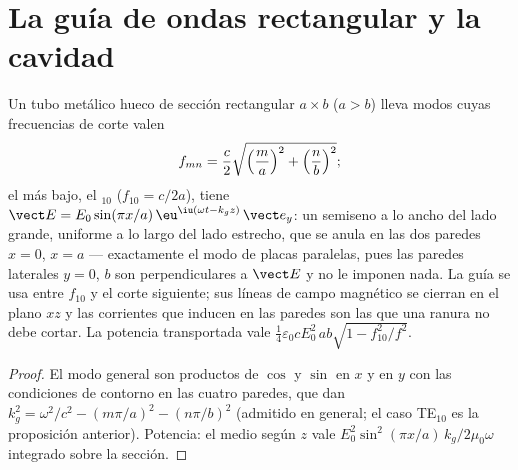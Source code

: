 \section{La guía de ondas rectangular y la cavidad}

\begin{proposition}\label{prop:b2:guided-waves:rectangular}
Un tubo metálico hueco de sección rectangular $a \times b$ ($a > b$) lleva
modos cuyas frecuencias de corte valen
\[
f_{mn} = \frac c2\sqrt{\Bigl(\frac ma\Bigr)^2 + \Bigl(\frac nb\Bigr)^2} ;
\]
el más bajo, el \emph{$_{10}$} ($f_{10} = c/2a$), tiene $\vect E = E_0\sin
(\pi x/a)\,\eu^{\iu(\omega t - k_gz)}\,\vect e_y$: un semiseno a lo ancho del lado
grande, uniforme a lo largo del lado estrecho, que se anula en las dos paredes $x = 0$,
$x = a$ --- exactamente el modo de placas paralelas, pues las paredes laterales $y = 0$, $b$
son perpendiculares a $\vect E$ y no le imponen nada. La guía se
usa entre $f_{10}$ y el corte siguiente; sus líneas de campo magnético
se cierran en el plano $xz$ y las corrientes que inducen en las paredes son
las que una ranura no debe cortar. La potencia transportada vale $\tfrac14\varepsilon_0cE_0^2\,ab
\sqrt{1 - f_{10}^2/f^2}$.
\end{proposition}

\begin{proof}
El modo general son productos de $\cos$ y $\sin$ en $x$ y en $y$ con las
condiciones de contorno en las cuatro paredes, que dan $k_g^2 = \omega^2/c^2 - (m\pi/a)^2
- (n\pi/b)^2$ (admitido en general; el caso TE$_{10}$ es la proposición
anterior). Potencia: el  medio según $z$ vale $E_0^2\sin^2(\pi x/a)
\,k_g/2\mu_0\omega$ integrado sobre la sección.
\end{proof}

